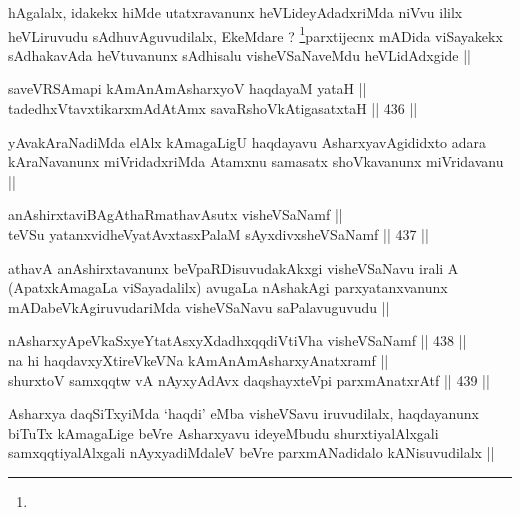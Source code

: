 \begin{artha}
hAgalalx, idakekx hiMde utatxravanunx heVLideyAdadxriMda niVvu ililx
heVLiruvudu sAdhuvAguvudilalx, EkeMdare ? \footnote{}parxtijecnx
mADida viSayakekx sAdhakavAda heVtuvanunx sAdhisalu visheVSaNaveMdu
heVLidAdxgide ||
\end{artha}


\begin{shl}
saveVRSAmapi kAmAnAmAsharxyoV haqdayaM yataH || \\
tadedhxVtavxtikarxmAdAtAmx savaRshoVkAtigasatxtaH ||  436 ||  
\end{shl}

\begin{artha}
yAvakAraNadiMda elAlx kAmagaLigU haqdayavu AsharxyavAgididxto adara
kAraNavanunx miVridadxriMda Atamxnu samasatx shoVkavanunx miVridavanu ||
\end{artha}


\begin{shl}
anAshirxtaviBAgAthaRmathavA\s sutx visheVSaNamf || \\
teVSu yatanxvidheVyatAvxtasxPalaM sAyxdivxsheVSaNamf ||  437 ||  
\end{shl}

\begin{artha}
athavA anAshirxtavanunx beVpaRDisuvudakAkxgi visheVSaNavu irali A
(ApatxkAmagaLa viSayadalilx) avugaLa nAshakAgi parxyatanxvanunx
mADabeVkAgiruvudariMda visheVSaNavu saPalavuguvudu ||
\end{artha}


\begin{shl}
nA\s \s sharxyApeVkaSxyeYtatAsxyXdadhxqqdiVtiVha visheVSaNamf ||  438 ||  \\
na hi haqdavxyXtireVkeVNa kAmAnAmAsharxyAnatxramf || \\
shurxtoV samxqqtw vA nAyxyAdAvx daqshayxteV\s pi parxmAnatxrAtf ||  439 ||  
\end{shl}

\begin{artha}
Asharxya daqSiTxyiMda `haqdi' eMba visheVSavu iruvudilalx, haqdayanunx
biTuTx kAmagaLige beVre Asharxyavu ideyeMbudu shurxtiyalAlxgali
samxqqtiyalAlxgali nAyxyadiMdaleV beVre parxmANadidalo kANisuvudilalx ||
\end{artha}

